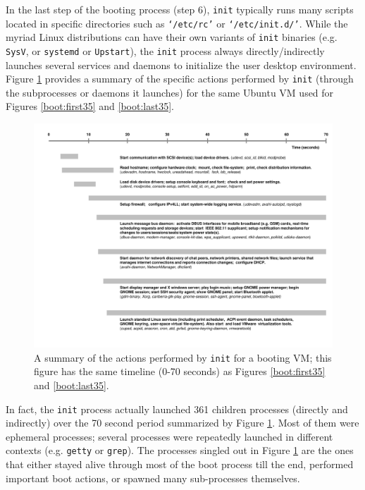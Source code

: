 In the last step of the booting
process (step 6), \texttt{init} typically
runs many scripts located in 
specific directories such as \texttt{`/etc/rc'}
or \texttt{`/etc/init.d/'}. While the myriad Linux distributions
can have their own variants of \texttt{init} binaries
(e.g. \texttt{SysV}, or \texttt{systemd} or \texttt{Upstart}),
the \texttt{init} process always directly/indirectly launches several 
services and daemons to initialize the user desktop
environment. Figure \ref{boot:services} provides a
summary of the specific actions performed by \texttt{init} 
(through the subprocesses or daemons it launches)
for the same Ubuntu VM used for 
Figures \ref{boot:first35} and \ref{boot:last35}.

\begin{figure}[h]
  \center
  \includegraphics[width=1.0\textwidth, trim=0.5cm 1cm 1cm 1cm]{boottimeline.pdf}
  \caption[A summary of the actions performed by \texttt{init} for a booting VM]%
  {A summary of the actions performed by \texttt{init} for a booting VM;
  this figure has the same timeline (0-70 seconds) as Figures \ref{boot:first35} and 
  \ref{boot:last35}.}
  \label{boot:services}
\end{figure}

In fact, the \texttt{init} process actually launched 361 children processes (directly
and indirectly) over the 70 second period summarized by Figure \ref{boot:services}.
Most of them were ephemeral processes; several processes were repeatedly launched
in different contexts (e.g. \texttt{getty} or \texttt{grep}). The processes singled out
in Figure \ref{boot:services} are the ones that either 
stayed alive through most of the boot process till the end, performed important
boot actions, or spawned many sub-processes themselves.

